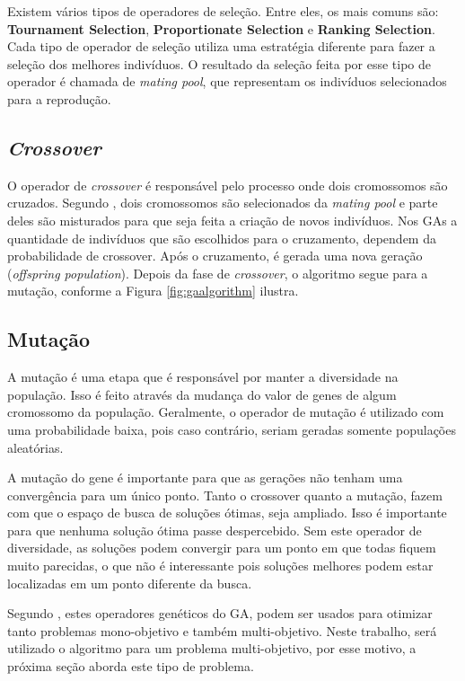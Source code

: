 Existem vários tipos de operadores de seleção. Entre eles, os mais comuns são: 
\textbf{Tournament Selection}, \textbf{Proportionate Selection} e 
\textbf{Ranking Selection}. Cada tipo de operador de seleção utiliza uma estratégia diferente 
para fazer a seleção dos melhores indivíduos. O resultado da seleção 
feita por esse tipo de operador é chamada de \textit{mating pool}, que representam 
os indivíduos selecionados para a reprodução.

\subsection{\textit{Crossover}}
O operador de \textit{crossover} é responsável pelo processo onde dois cromossomos 
são cruzados. Segundo \cite{ghosh}, dois cromossomos são selecionados da \textit{mating pool}
e parte deles são misturados para que seja feita a criação de novos indivíduos. 
Nos GAs a quantidade de indivíduos que são escolhidos para o cruzamento, dependem da probabilidade
de crossover. Após o cruzamento, é gerada uma nova geração (\textit{offspring population}). 
Depois da fase de \textit{crossover}, o algoritmo segue para a mutação,
conforme a Figura \ref{fig:gaalgorithm} ilustra.

\subsection{Mutação}
A mutação é uma etapa que é responsável por manter a diversidade na população. Isso
é feito através da mudança do valor de genes de algum cromossomo da população. Geralmente, o operador
de mutação é utilizado com uma probabilidade baixa, pois caso contrário, seriam
geradas somente populações aleatórias. 

A mutação do gene é importante para que as gerações não tenham uma convergência para 
um único ponto. Tanto o crossover quanto a mutação, fazem com que o espaço de busca
de soluções ótimas, seja ampliado. Isso é importante para que nenhuma solução ótima
passe despercebido. Sem este operador de diversidade, as soluções podem convergir para
um ponto em que todas fiquem muito parecidas, o que não é interessante pois soluções
melhores podem estar localizadas em um ponto diferente da busca.

Segundo \cite{ghosh}, estes operadores genéticos do GA, podem ser usados para otimizar tanto
problemas mono-objetivo e também multi-objetivo. Neste trabalho, será utilizado
o algoritmo para um problema multi-objetivo, por esse motivo, a próxima seção aborda
este tipo de problema.

